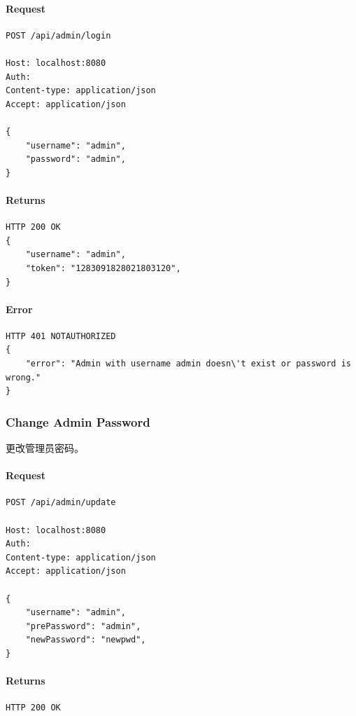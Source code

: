 \documentclass{article}
\begin{document}
\paragraph*{Request}
\begin{lstlisting}
POST /api/admin/login

Host: localhost:8080
Auth:
Content-type: application/json
Accept: application/json

{
    "username": "admin",
    "password": "admin",
}
\end{lstlisting}

\paragraph*{Returns}
\begin{lstlisting}
HTTP 200 OK
{
    "username": "admin",
    "token": "1283091828021803120",
}

\end{lstlisting}

\paragraph*{Error}
\begin{lstlisting}
HTTP 401 NOTAUTHORIZED
{
    "error": "Admin with username admin doesn\'t exist or password is wrong."
}
\end{lstlisting}

\subsubsection{Change Admin Password}
更改管理员密码。

\paragraph*{Request}
\begin{lstlisting}
POST /api/admin/update

Host: localhost:8080
Auth:
Content-type: application/json
Accept: application/json

{
    "username": "admin",
    "prePassword": "admin",
    "newPassword": "newpwd",
}
\end{lstlisting}

\paragraph*{Returns}
\begin{lstlisting}
HTTP 200 OK

\end{lstlisting}
\end{document}
